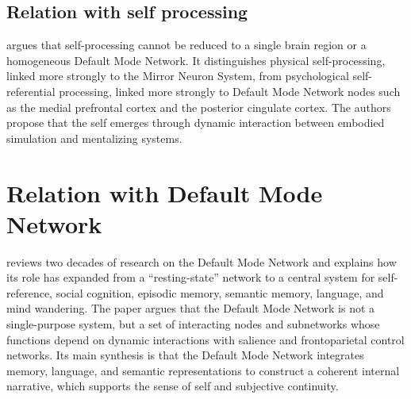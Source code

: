 \documentclass[a4paper]{article}
\begin{document}
    
    \subsection{Relation with self processing}
        \cite{molnar-szakacs-2013-self-processing-and-the-default-mode-network-interactions-with-the-mirror-neuron-system} argues that self-processing cannot be reduced to a single brain region or a homogeneous Default Mode Network. It distinguishes physical self-processing, linked more strongly to the Mirror Neuron System, from psychological self-referential processing, linked more strongly to Default Mode Network nodes such as the medial prefrontal cortex and the posterior cingulate cortex. The authors propose that the self emerges through dynamic interaction between embodied simulation and mentalizing systems.
    
    
    \section{Relation with Default Mode Network}
        \cite{menon-2023-20-years-of-the-default-mode-network-a-review-and-synthesis} reviews two decades of research on the Default Mode Network and explains how its role has expanded from a “resting-state” network to a central system for self-reference, social cognition, episodic memory, semantic memory, language, and mind wandering. The paper argues that the Default Mode Network is not a single-purpose system, but a set of interacting nodes and subnetworks whose functions depend on dynamic interactions with salience and frontoparietal control networks. Its main synthesis is that the Default Mode Network integrates memory, language, and semantic representations to construct a coherent internal narrative, which supports the sense of self and subjective continuity.
        
        
        
\end{document}
